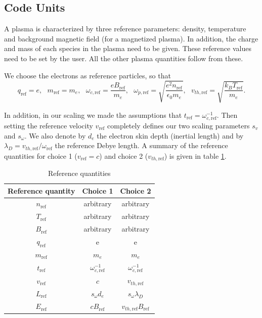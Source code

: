 \documentclass[english]{article}
\newcommand{\tr}{t_{\mathrm{ref}}}
\newcommand{\xr}{L_{\mathrm{ref}}}
\newcommand{\nr}{n_{\mathrm{ref}}}
\newcommand{\qr}{q_{\mathrm{ref}}}
\newcommand{\Tr}{T_{\mathrm{ref}}}
\newcommand{\mr}{m_{\mathrm{ref}}}
\newcommand{\Br}{B_{\mathrm{ref}}}
\newcommand{\Er}{E_{\mathrm{ref}}}
\newcommand{\vr}{v_{\mathrm{ref}}}
\newcommand{\vthr}{v_{th,\mathrm{ref}}}
\newcommand{\omr}{\omega_{\mathrm{ref}}}
\newcommand{\ompr}{\omega_{p,\mathrm{ref}}}
\newcommand{\omcr}{\omega_{c,\mathrm{ref}}}
\begin{document}
\subsection{Code Units}

A plasma is characterized by three reference parameters: density, temperature and background magnetic field (for a magnetized plasma). In addition, the charge and mass of each species in the plasma need to be given. These reference values need to be set by the user. All the other plasma quantities follow from these.

We choose the electrons as reference particles, so that
$$\qr = e, ~~~ \mr=m_e, ~~~ \omcr=\frac{e\Br}{m_e}, ~~~ \ompr=\sqrt{\frac{e^2\nr}{\epsilon_0m_e}}, ~~~ \vthr= \sqrt{\frac{k_B \Tr}{m_e}} .$$

In addition, in our scaling we made the assumptions that $\tr = \omcr^{-1}$.
Then setting the reference velocity $\vr$ completely defines our two scaling parameters $s_v$ and $s_\omega$.
We also denote by $d_e$ the electron skin depth (inertial length) and by
$\lambda_D=\vthr/\omr$ the reference Debye length.
A summary of the reference quantities for choice 1 ($\vr=c$) and choice 2 ($\vthr$) is given in table \ref{tab:refq}.

\begin{table}[htbp]
	\caption{Reference quantities \label{tab:refq}}
	\centering\begin{tabular}{c|c|c}
		Reference quantity & Choice 1       & Choice 2             \\ \hline
		$\nr$              & arbitrary      & arbitrary            \\
		$\Tr$              & arbitrary      & arbitrary            \\
		$\Br$              & arbitrary      & arbitrary            \\
		$\qr$              & e              & e                    \\
		$\mr$              & $m_e$          & $m_e$                \\
		$\tr$              & $ \omcr^{-1}$  & $ \omcr^{-1}$        \\
		$\vr$              & $c$            & $\vthr$              \\
		$\xr$              & $s_\omega d_e$ & $s_\omega \lambda_D$ \\
		$\Er$              & $c\Br$         & $\vthr\Br$           \\
	\end{tabular}
\end{table}
\end{document}
